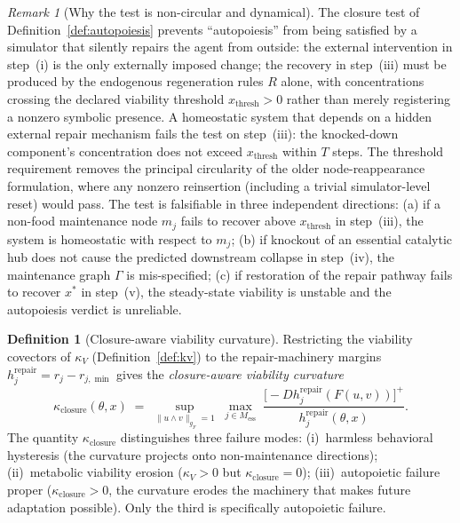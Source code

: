 \documentclass[11pt,a4paper]{article}
\theoremstyle{plain}
\theoremstyle{definition}
\newtheorem{definition}[theorem]{Definition}
\theoremstyle{remark}
\newtheorem{remark}[theorem]{Remark}
\newcommand{\kk}{\kappa_{\!V}}
\begin{document}
\begin{remark}[Why the test is non-circular and dynamical]
The closure test of Definition~\ref{def:autopoiesis} prevents
``autopoiesis'' from being satisfied by a simulator that silently
repairs the agent from outside: the external intervention in step~(i)
is the only externally imposed change; the recovery in step~(iii) must
be produced by the endogenous regeneration rules $R$ alone, with
concentrations crossing the declared viability threshold
$x_{\mathrm{thresh}} > 0$ rather than merely registering a nonzero
symbolic presence. A homeostatic system that depends on a hidden
external repair mechanism fails the test on step~(iii): the knocked-down
component's concentration does not exceed $x_{\mathrm{thresh}}$ within
$T$ steps. The threshold requirement removes the principal circularity
of the older node-reappearance formulation, where any nonzero
reinsertion (including a trivial simulator-level reset) would pass.
The test is falsifiable in three independent directions: (a) if a
non-food maintenance node $m_j$ fails to recover above
$x_{\mathrm{thresh}}$ in step~(iii), the system is homeostatic with
respect to $m_j$; (b) if knockout of an essential catalytic hub does
not cause the predicted downstream collapse in step~(iv), the
maintenance graph $\Gamma$ is mis-specified; (c) if restoration of
the repair pathway fails to recover $x^*$ in step~(v), the
steady-state viability is unstable and the autopoiesis verdict is
unreliable.
\end{remark}

\begin{definition}[Closure-aware viability curvature]
\label{def:kappa-closure}
Restricting the viability covectors of $\kk$
(Definition~\ref{def:kv}) to the repair-machinery
margins $h_j^{\mathrm{repair}} = r_j - r_{j,\min}$ gives the
\emph{closure-aware viability curvature}
\begin{equation}\label{eq:kappa-closure}
  \kappa_{\mathrm{closure}}(\theta, x) \;=\;
  \sup_{\|u \wedge v\|_{g_F} = 1}\;
  \max_{j \in M_{\mathrm{ess}}}\;
  \frac{\bigl[-D h_j^{\mathrm{repair}}(F(u, v))\bigr]^+}{h_j^{\mathrm{repair}}(\theta, x)}.
\end{equation}
The quantity $\kappa_{\mathrm{closure}}$ distinguishes three failure
modes: (i)~harmless behavioral hysteresis (the curvature projects onto
non-maintenance directions); (ii)~metabolic viability erosion
($\kk > 0$ but $\kappa_{\mathrm{closure}} = 0$); (iii)~autopoietic
failure proper ($\kappa_{\mathrm{closure}} > 0$, the curvature erodes
the machinery that makes future adaptation possible). Only the third
is specifically autopoietic failure.
\end{definition}
\end{document}

